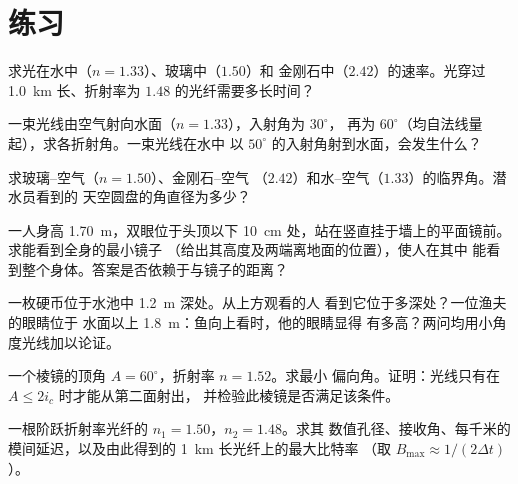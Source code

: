 \section{练习}

\begin{exercise}[$\star$]\label{exo:b1:rays-reflection-refraction:1}
求光在水中（$n = 1.33$）、玻璃中（$1.50$）和
金刚石中（$2.42$）的速率。光穿过
\qty{1.0}{km} 长、折射率为 $1.48$ 的光纤需要多长时间？
\end{exercise}

\begin{exercise}[$\star$]\label{exo:b1:rays-reflection-refraction:2}
一束光线由空气射向水面（$n = 1.33$），入射角为 $30^\circ$，
再为 $60^\circ$（均自法线量起），求各折射角。一束光线在水中
以 $50^\circ$ 的入射角射到水面，会发生什么？
\end{exercise}

\begin{exercise}[$\star$]\label{exo:b1:rays-reflection-refraction:3}
求玻璃–空气（$n = 1.50$）、金刚石–空气
（$2.42$）和水–空气（$1.33$）的临界角。潜水员看到的
天空圆盘的角直径为多少？
\end{exercise}

\begin{exercise}[$\star$]\label{exo:b1:rays-reflection-refraction:4}
一人身高 \qty{1.70}{m}，双眼位于头顶以下 \qty{10}{cm}
处，站在竖直挂于墙上的平面镜前。求能看到全身的最小镜子
（给出其高度及两端离地面的位置），使人在其中
能看到整个身体。答案是否依赖于与镜子的距离？
\end{exercise}

\begin{exercise}[$\star\star$]\label{exo:b1:rays-reflection-refraction:5}
一枚硬币位于水池中 \qty{1.2}{m} 深处。从上方观看的人
看到它位于多深处？一位渔夫的眼睛位于
水面以上 \qty{1.8}{m}：鱼向上看时，他的眼睛显得
有多高？两问均用小角度光线加以论证。
\end{exercise}

\begin{exercise}[$\star\star$]\label{exo:b1:rays-reflection-refraction:6}
一个棱镜的顶角 $A = 60^\circ$，折射率 $n = 1.52$。求最小
偏向角。证明：光线只有在 $A \leq 2 i_c$ 时才能从第二面射出，
并检验此棱镜是否满足该条件。
\end{exercise}

\begin{exercise}[$\star\star$]\label{exo:b1:rays-reflection-refraction:7}
一根阶跃折射率光纤的 $n_1 = 1.50$，$n_2 = 1.48$。求其
数值孔径、接收角、每千米的模间延迟，以及由此得到的
\qty{1}{km} 长光纤上的最大比特率
（取 $B_{\max} \approx 1/(2\Delta t)$）。
\end{exercise}

